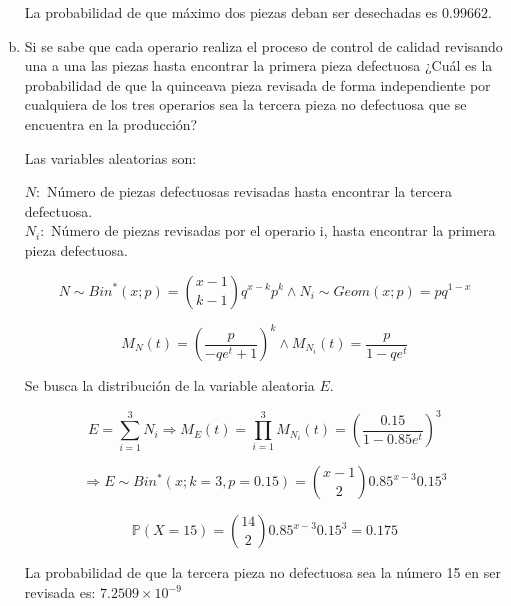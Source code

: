 \documentclass[../main.tex]{subfiles}
\begin{document}
\begin{enumerate}[(a)]
La probabilidad de que máximo dos piezas deban ser desechadas es $0.99662$.

\item Si se sabe que cada operario realiza el proceso de control de calidad
revisando una a una las piezas hasta encontrar la primera pieza defectuosa ¿Cuál
es la probabilidad de que la quinceava pieza revisada de forma independiente por
cualquiera de los tres operarios sea la tercera pieza no defectuosa que se encuentra
en la producción?

Las variables aleatorias son:

$N: $ Número de piezas defectuosas revisadas hasta encontrar la tercera defectuosa.\\
$N_{i}: $ Número de piezas revisadas por el operario i, hasta encontrar la primera pieza defectuosa.

$$N \sim Bin^*(x; p) = \binom{x - 1}{k - 1}q^{x - k}p^k \wedge N_{i} \sim Geom(x; p) = pq^{1 - x}$$

$$M_{N}(t) = \left( \frac{p}{-qe^t + 1} \right) ^ k \wedge M_{N_i}(t) = \frac{p}{1-qe^t}$$

Se busca la distribución de la variable aleatoria $E$.

$$E = \sum_{i = 1}^{3} N_{i} \Rightarrow M_{E}(t) = \prod_{i = 1}^{3} M_{N_i}(t) = \left( \frac{0.15}{1-0.85e^t} \right)^3$$

$$\Rightarrow E \sim Bin^*(x; k = 3, p = 0.15) = \binom{x - 1}{2}0.85^{x - 3}0.15^3$$

$$\mathbb{P}(X = 15) = \binom{14}{2}0.85^{x - 3}0.15^3 = 0.175$$

La probabilidad de que la tercera pieza no defectuosa sea la número 15 en ser revisada es: $7.2509 \times 10^{-9}$

\end{enumerate}
\end{document}
